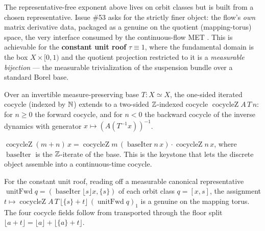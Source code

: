 The representative-free exponent above lives on orbit classes but is built from a chosen
representative. Issue \#53 asks for the strictly finer object: the flow's \emph{own} matrix
derivative data, packaged as a genuine  on the quotient (mapping-torus) space, the
very interface consumed by the continuous-flow MET . This is achievable for the
\textbf{constant unit roof} $\tau \equiv 1$, where the fundamental domain is the box $X \times [0,1)$
and the quotient projection restricted to it is a \emph{measurable bijection} --- the measurable
trivialization of the suspension bundle over a standard Borel base.

\begin{definition}\label{cocycleZ}
  \leanok
  Over an invertible measure-preserving base $T : X \simeq X$, the one-sided iterated cocycle
  (indexed by $\mathbb{N}$) extends to a two-sided $\mathbb{Z}$-indexed cocycle $\operatorname{cocycleZ} A\,T\,n$: for
  $n \ge 0$ the forward cocycle, and for $n < 0$ the backward cocycle of the inverse dynamics with
  generator $x \mapsto (A(T^{-1}x))^{-1}$.
\end{definition}

\begin{theorem}\label{cocycleZ_add}
  \leanok
  $\operatorname{cocycleZ}(m + n)\,x = \operatorname{cocycleZ} m\,(\operatorname{baseIter} n\,x)
  \cdot \operatorname{cocycleZ} n\,x$, where $\operatorname{baseIter}$ is the $\mathbb{Z}$-iterate of the
  base. This is the keystone that lets the discrete object assemble into a continuous-time cocycle.
\end{theorem}

\begin{definition}\label{quotientFlowCocycle}
  \leanok
  For the constant unit roof, reading off a measurable canonical representative
  $\operatorname{unitFwd} q = (\operatorname{baseIter}\lfloor s\rfloor x, \{s\})$ of each orbit class
  $q = [x,s]$, the assignment $t \mapsto \operatorname{cocycleZ} A\,T\,\lfloor \{s\} + t\rfloor\,
  (\operatorname{unitFwd} q)_1$ is a genuine  on the mapping torus. The four cocycle
  fields follow from  transported through the floor split
  $\lfloor a + t\rfloor = \lfloor a\rfloor + \lfloor \{a\} + t\rfloor$.
\end{definition}

